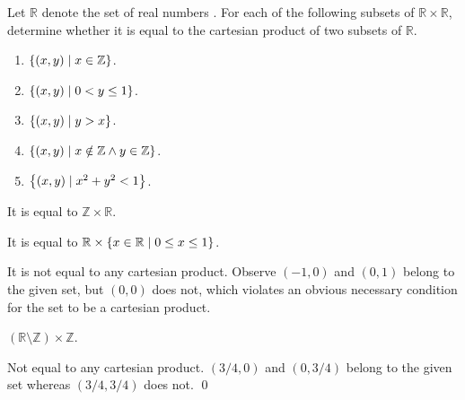 \documentclass[a4paper,12pt]{article}
\begin{document}
\begin{exe}
	Let \( \mathbb{R} \) denote the set of real numbers .
	For each of the following subsets of \( \mathbb{R} \times \mathbb{R} \),
	determine whether it is equal to the cartesian product of two subsets of \( \mathbb{R} \).
	\begin{enumerate}
		\item
		      \( \left\{ (x,y) \;|\; x \in \mathbb{Z} \right\} \).
		      
		\item
		      \( \left\{ (x,y) \;|\; 0< y \le 1\right\} \).
		      
		\item
		      \( \left\{ (x,y) \;|\; y>x\right\} \).
		      
		\item
		      \( \left\{ (x,y) \;|\;  x \notin \mathbb{Z} \wedge y \in \mathbb{Z} \right\} \).
		      
		\item
		      \( \left\{ (x,y) \;|\; x^2 + y^2 < 1\right\} \).
	\end{enumerate}
\end{exe}\begin{sol}\leavevmode \par%
	It is equal to
	\( \mathbb{Z} \times \mathbb{R} \).
	
	It is equal to
	\( \mathbb{R} \times \left\{ x\in \mathbb{R} \;|\; 0\le x \le 1 \right\} \).
	
	It is not equal to any cartesian product.
	Observe \( (-1,0) \) and \( (0,1) \) belong to the given set, but \( (0,0) \) does not,
	which violates an obvious necessary condition for the set to be a cartesian product.
	
	\( \left( \mathbb{R} \setminus \mathbb{Z} \right) \times \mathbb{Z}\).
	
	Not equal to any cartesian product.
	\( (3/4,0) \)
	and
	\( (0,3/4) \)
	belong to the given set
	whereas
	\( (3/4,3/4) \)
	does not.
	\qed\end{sol}
\end{document}
